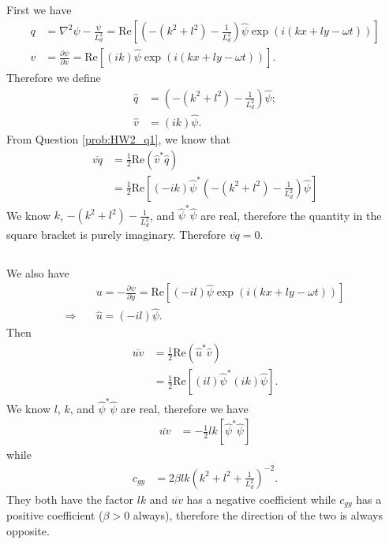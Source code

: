 \documentclass[11pt,letterpaper]{book}
\theoremstyle{definition}
\newcommand{\pe}{\partial}
\newcommand{\dsp}{\displaystyle}
\newcommand{\thus}{\Rightarrow \quad }
\newcommand{\re}{\text{Re}}
\begin{document}
\subsection{}
First we have
\begin{align*}
q &= \nabla^2\psi-\frac{\psi}{L_d^2} = \re\left[\left(-(k^2+l^2)-\frac{1}{L_d^2}\right)\hat{\psi}\exp(i(kx+ly-\omega t)) \right]\\
v &= \frac{\pe\psi}{\pe x} = \re\left[\left(ik\right)\hat{\psi}\exp(i(kx+ly-\omega t)) \right].
\end{align*}
Therefore we define
\begin{align*}
\hat{q} &= \left(-(k^2+l^2)-\frac{1}{L_d^2}\right)\hat{\psi};\\
\hat{v} &= \left(ik\right)\hat{\psi}.
\end{align*}
From Question \ref{prob:HW2_q1}, we know that
\begin{align*}
\overline{vq} &= \frac{1}{2}\re\left(\hat{v}^*\hat{q} \right)\\
&= \frac{1}{2}\re\left[\left(-ik\right)\hat{\psi}^*\left(-(k^2+l^2)-\frac{1}{L_d^2}\right)\hat{\psi}\right]
\end{align*}
We know $k$, $\dsp{-(k^2+l^2)-\frac{1}{L_d^2}}$, and $\hat{\psi}^*\hat{\psi}$ are real, therefore the quantity in the square bracket is purely imaginary. Therefore $\overline{vq} = 0$.

\subsection{}
We also have
\begin{align*}
&u = -\frac{\pe\psi}{\pe y} = \re\left[\left(-il\right)\hat{\psi}\exp(i(kx+ly-\omega t)) \right]\\
\thus &\hat{u} = \left(-il\right)\hat{\psi}.
\end{align*}
Then
\begin{align*}
\overline{uv} &= \frac{1}{2}\re\left(\hat{u}^*\hat{v} \right)\\
&= \frac{1}{2}\re\left[ \left(il\right)\hat{\psi}^*\left(ik\right)\hat{\psi} \right].
\end{align*}
We know $l$, $k$, and $\hat{\psi}^*\hat{\psi}$ are real, therefore we have
\begin{align*}
\overline{uv} &= -\frac{1}{2}lk \left[ \hat{\psi}^*\hat{\psi} \right]
\end{align*}
while
\begin{align*}
c_{gy} &= 2\beta l k\left( k^2+l^2+\frac{1}{L_d^2} \right)^{-2}.
\end{align*}
They both have the factor $lk$ and $\overline{uv}$ has a negative coefficient while $c_{gy}$ has a positive coefficient ($\beta>0$ always), therefore the direction of the two is always opposite.
\end{document}
